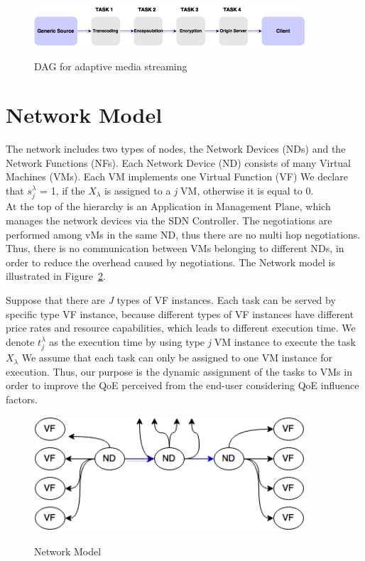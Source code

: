\documentclass[a4paper]{article}
\begin{document}
\begin{figure}[!ht]
  \caption{DAG for adaptive media streaming}
  \centering
    \includegraphics[width=0.9\textwidth]{adaptivestreamingtaks.png}
    \label{fig:adaptivestreaming}
\end{figure}

\section{Network Model}
The network includes two types of nodes, the Network Devices (NDs) and the Network Functions (NFs). Each Network Device (ND) consists of many Virtual Machines (VMs). Each VM implements one Virtual Function (VF) %
We declare that $s_j^\lambda$ = 1, if the $X_\lambda$ is assigned to a \textit{j} VM, otherwise it is equal to 0. \\

At the top of the hierarchy is an Application in Management Plane, which manages the network devices via the SDN Controller.
The negotiations are performed among vMs in the same ND, thus there are no multi hop negotiations. Thus, there is no communication between VMs belonging to different NDs, in order to reduce the overhead caused by negotiations. The Network model is illustrated in Figure~\ref{fig:networkmodel}.

Suppose that there are \textit{J} types of VF instances. Each task can be served by specific type VF instance, because different types of VF instances have different price rates and resource capabilities, which leads to different execution time. 
We denote  $t^\lambda_j$ as the execution time by using type \textit{j} VM instance to execute the task $X_\lambda$
We assume that each task can only be assigned to one VM instance for execution. Thus, our purpose is the dynamic assignment of the tasks to VMs in order to improve the QoE perceived from the end-user considering QoE influence factors. 


\begin{figure}[!ht]
  \caption{Network Model}
  \centering
    \includegraphics[width=0.9\textwidth]{networkmodel3.png}
    \label{fig:networkmodel}
\end{figure}
\end{document}
